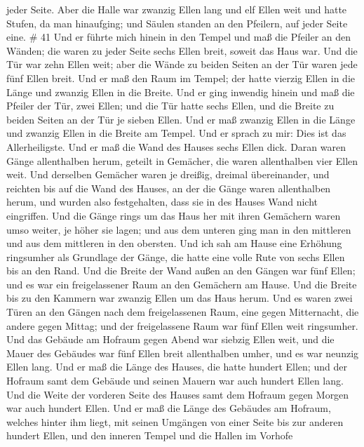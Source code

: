 jeder Seite.  Aber die Halle war zwanzig Ellen lang und elf
Ellen weit und hatte Stufen, da man hinaufging; und Säulen standen an
den Pfeilern, auf jeder Seite eine. \# 41  Und er führte
mich hinein in den Tempel und maß die Pfeiler an den Wänden; die waren
zu jeder Seite sechs Ellen breit, soweit das Haus war.  Und
die Tür war zehn Ellen weit; aber die Wände zu beiden Seiten an der Tür
waren jede fünf Ellen breit. Und er maß den Raum im Tempel; der hatte
vierzig Ellen in die Länge und zwanzig Ellen in die Breite. 
Und er ging inwendig hinein und maß die Pfeiler der Tür, zwei Ellen; und
die Tür hatte sechs Ellen, und die Breite zu beiden Seiten an der Tür je
sieben Ellen.  Und er maß zwanzig Ellen in die Länge und
zwanzig Ellen in die Breite am Tempel. Und er sprach zu mir: Dies ist
das Allerheiligste.  Und er maß die Wand des Hauses sechs
Ellen dick. Daran waren Gänge allenthalben herum, geteilt in Gemächer,
die waren allenthalben vier Ellen weit.  Und derselben
Gemächer waren je dreißig, dreimal übereinander, und reichten bis auf
die Wand des Hauses, an der die Gänge waren allenthalben herum, und
wurden also festgehalten, dass sie in des Hauses Wand nicht eingriffen.
 Und die Gänge rings um das Haus her mit ihren Gemächern
waren umso weiter, je höher sie lagen; und aus dem unteren ging man in
den mittleren und aus dem mittleren in den obersten.  Und
ich sah am Hause eine Erhöhung ringsumher als Grundlage der Gänge, die
hatte eine volle Rute von sechs Ellen bis an den Rand.  Und
die Breite der Wand außen an den Gängen war fünf Ellen; und es war ein
freigelassener Raum an den Gemächern am Hause.  Und die
Breite bis zu den Kammern war zwanzig Ellen um das Haus herum.
 Und es waren zwei Türen an den Gängen nach dem
freigelassenen Raum, eine gegen Mitternacht, die andere gegen Mittag;
und der freigelassene Raum war fünf Ellen weit ringsumher. 
Und das Gebäude am Hofraum gegen Abend war siebzig Ellen weit, und die
Mauer des Gebäudes war fünf Ellen breit allenthalben umher, und es war
neunzig Ellen lang.  Und er maß die Länge des Hauses, die
hatte hundert Ellen; und der Hofraum samt dem Gebäude und seinen Mauern
war auch hundert Ellen lang.  Und die Weite der vorderen
Seite des Hauses samt dem Hofraum gegen Morgen war auch hundert Ellen.
 Und er maß die Länge des Gebäudes am Hofraum, welches
hinter ihm liegt, mit seinen Umgängen von einer Seite bis zur anderen
hundert Ellen, und den inneren Tempel und die Hallen im Vorhofe
